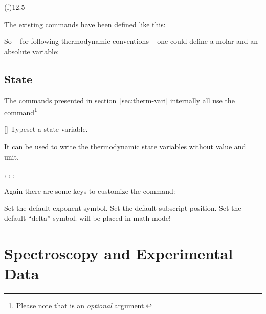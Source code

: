 \documentclass[load-preamble+]{cnltx-doc}
\begin{document}
\begin{example}
  \RenewChemState{}
  \Enthalpy(f){12.5}
\end{example}

The existing commands have been defined like this:
\begin{sourcecode}
  \NewChemState{}
  \NewChemState{}
    {\joule\per\kelvin\per\mole}
  \NewChemState{}
\end{sourcecode}

So -- for following thermodynamic conventions -- one could define a molar and
an absolute variable:
\begin{example}
  \NewChemState{}%
  \RenewChemState{}%
   
\end{example}

\subsection{State}\label{ssec:state}

The commands presented in section~\ref{sec:therm-vari} internally all use the
command\footnote{Please note that  is an \emph{optional}
  argument.}
\begin{commands}
  []
    Typeset a state variable.
\end{commands}

It can be used to write the thermodynamic state variables without value and
unit.

\begin{example}
  , ,
  ,
\end{example}

Again there are some keys to customize the command:
\begin{options}
    Set the default exponent symbol.
    Set the default subscript position.
    Set the default ``delta'' symbol.   will be placed in math
    mode!
\end{options}

\section{Spectroscopy and Experimental Data}\label{sec:spektroskopie}
\end{document}
